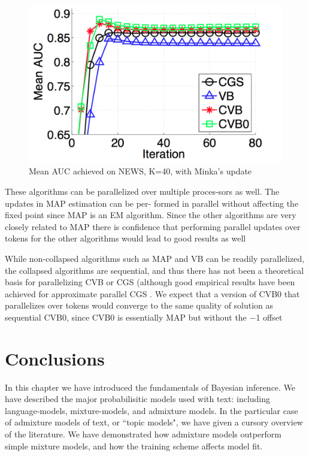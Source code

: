 \begin{figure}
  \centering
    \hspace*{-1.5cm}\includegraphics[height=0.33\textheight]{./Chap1/plots/figs/fig9.png}
  \caption{Mean AUC achieved on NEWS, K=40, with Minka’s update}
  \label{fig:chap1-fig9}
\end{figure}

These algorithms can be parallelized over multiple proces-sors as well. The updates in MAP estimation can be per- formed in parallel without affecting the fixed point since MAP is an EM algorithm. Since the other algorithms are very closely related to MAP there is confidence that performing parallel updates over tokens for the other algorithms would lead to good results as well

While non-collapsed algorithms such as MAP and VB can be readily parallelized, the collapsed algorithms are sequential, and thus there has not been a theoretical basis for parallelizing CVB or CGS (although good empirical results have been achieved for approximate parallel CGS\cite{Newman2009} . We expect that a version of CVB0 that parallelizes over tokens would converge to the same quality of solution as sequential CVB0, since CVB0 is essentially MAP but without the −1 offset

\section{Conclusions}
In this chapter we have introduced the fundamentals of Bayesian inference. We have described the major probabilisitic models used with text: including language-models, mixture-models, and admixture models. In the particular case of admixture models of text, or ``topic models", we have given a cursory overview of the literature. We have demonstrated how admixture models outperform simple mixture models, and how the training scheme affects model fit. 

